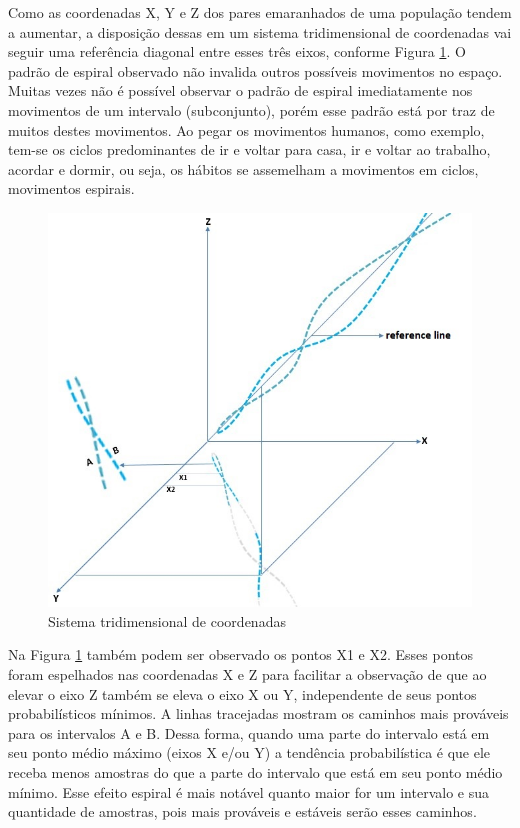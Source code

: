 Como as coordenadas X, Y e Z dos pares emaranhados de uma população tendem a aumentar, a disposição dessas em um sistema tridimensional de coordenadas vai seguir uma referência diagonal entre esses três eixos, conforme Figura \ref{fig:consciousness_space_spiral_reference_line}. O padrão de espiral observado não invalida outros possíveis movimentos no espaço. Muitas vezes não é possível observar o padrão de espiral imediatamente nos movimentos de um intervalo (subconjunto), porém esse padrão está por traz de muitos destes movimentos. Ao pegar os movimentos humanos, como exemplo, tem-se os ciclos predominantes de ir e voltar para casa, ir e voltar ao trabalho, acordar e dormir, ou seja, os hábitos se assemelham a movimentos em ciclos, movimentos espirais.
	\begin{figure}[H]
	\caption{Sistema tridimensional de coordenadas}
	\label{fig:consciousness_space_spiral_reference_line}
	\centering
	\includegraphics[scale=.6]{sections/images/consciousness_space_spiral_reference_line.jpg}
	\end{figure}

Na Figura \ref{fig:consciousness_space_spiral_reference_line} também podem ser observado os pontos X1 e X2. Esses pontos foram espelhados nas coordenadas X e Z para facilitar a observação de que ao elevar o eixo Z também se eleva o eixo X ou Y, independente de seus pontos probabilísticos mínimos. A linhas tracejadas mostram os caminhos mais prováveis para os intervalos A e B. Dessa forma, quando uma parte do intervalo está em seu ponto médio máximo (eixos X e/ou Y) a tendência probabilística é que ele receba menos amostras do que a parte do intervalo que está em seu ponto médio mínimo. Esse efeito espiral é mais notável quanto maior for um intervalo e sua quantidade de amostras, pois mais prováveis e estáveis serão esses caminhos.

